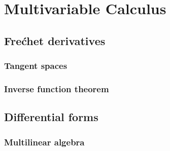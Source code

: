 \documentclass{../../large}
\begin{document}
\section{}

\begin{prb}
\end{prb}













\part{Multivariable Calculus}
\chapter{Fre\'chet derivatives}
\section{Tangent spaces}
\begin{prb}

\end{prb}

\section{Inverse function theorem}






\chapter{Differential forms}
\section{Multilinear algebra}

\begin{prb}
\end{prb}

\begin{prb}
\end{prb}
\end{document}
